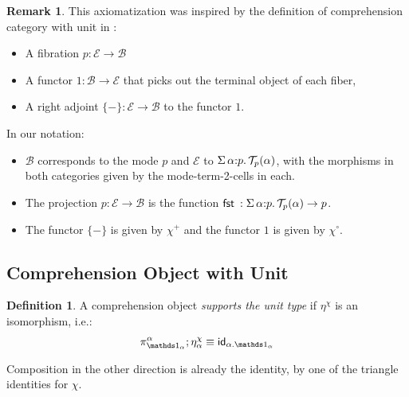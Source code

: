 \documentclass[10pt]{article}
\theoremstyle{definition}
\newtheorem{definition}{Definition}
\newtheorem{remark}{Remark}
\newcommand\dsd[1]{\ensuremath{\mathsf{#1}}}
\newcommand{\app}[2]{\ensuremath{#1 \: #2}}
\newcommand{\sigmacl}[3]{\ensuremath{\textnormal{$\Sigma$}\,#1{:}#2.\,#3}}
\newcommand{\fst}[1]{\app{\dsd{fst}}{#1}}
\newcommand{\id}{\mathsf{id}}
\newcommand\El[2]{\mathcal{T}_{#1}(#2)}
\begin{document}
\begin{remark}
This axiomatization was inspired by the definition of comprehension
category with unit in \cite{ahman+16fibered}:
\begin{itemize}
\item A fibration $p : \mathcal{E} \to \mathcal{B}$
\item A functor $1 : \mathcal{B} \to \mathcal{E}$ that picks out the terminal object of each fiber,
\item A right adjoint $\{-\} : \mathcal{E} \to \mathcal{B}$ to the functor $1$.
\end{itemize}
In our notation:
\begin{itemize}
\item $\mathcal{B}$ corresponds to the mode $p$ and $\mathcal{E}$ to $\sigmacl{\alpha}{p}{\El{p}{\alpha}}$, with the morphisms in both categories given by the mode-term-2-cells in each.

\item The projection $p : \mathcal{E} \to \mathcal{B}$ is the function $\fst : \sigmacl{\alpha}{p}{\El{p}{\alpha}} \to p$. 

\item The functor $\{-\}$ is given by $\chi^+$ and the functor $1$ is given by $\chi^\circ$.
\end{itemize}
\end{remark}

\subsection{Comprehension Object with Unit}
\begin{definition}
A comprehension object \emph{supports the unit type} if $\eta^\chi$ is an isomorphism, i.e.:
\begin{align}
\pi^\alpha_{\One_\alpha} ; \eta^\chi_\alpha \equiv \id_{\alpha.\One_\alpha}
\end{align}
\end{definition}
Composition in the other direction is already the identity, by one of the triangle identities for $\chi$.
\end{document}
